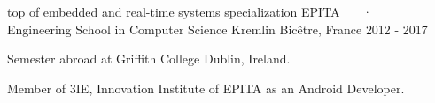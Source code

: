 

\begin{cventries}

  \cventry
    {top of embedded and real-time systems specialization} %
    {EPITA ~~~·~~~ Engineering School in Computer Science} %
    {Kremlin Bicêtre, France} %
    {2012 - 2017} %
    {
      \begin{cvitems} %
        \item {Semester abroad at Griffith College Dublin, Ireland.}
        \item {Member of 3IE, Innovation Institute of EPITA as an Android Developer.}
      \end{cvitems}
    }

\end{cventries}
